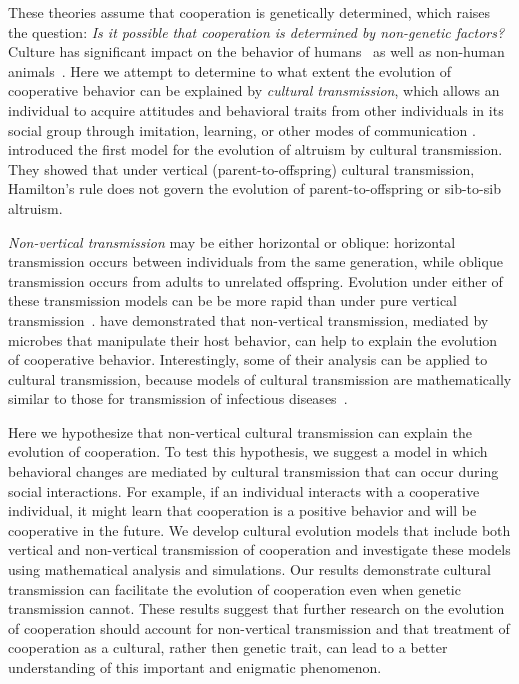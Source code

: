 \documentclass[12pt]{extarticle}
\begin{document}
These theories assume that cooperation is genetically determined, which raises the question: \emph{Is it possible that cooperation is determined by non-genetic factors?}
Culture has significant impact on the behavior of humans~\citep{ihara2004cultural,jeong2018bronze} as well as non-human animals~\citep{bonner2018evolution}.
Here we attempt to determine to what extent the evolution of cooperative behavior can be explained by \emph{cultural transmission},
which allows an individual to acquire attitudes and behavioral traits from other individuals in its social group through imitation, learning, or other modes of communication \citep{cavalli1981cultural,richerson2008not}.
\citet{feldman1985gene} introduced the first model for the evolution of altruism by cultural transmission.
They showed that under vertical (parent-to-offspring) cultural transmission, Hamilton's rule does not govern the evolution of parent-to-offspring or sib-to-sib altruism.

\emph{Non-vertical transmission} may be either horizontal or oblique: horizontal transmission occurs between individuals from the same generation, while oblique transmission occurs from adults to unrelated offspring. 
Evolution under either of these transmission models  can be be more rapid than under pure vertical transmission~\citep{cavalli1981cultural,ram2018evolution}.
\citet{lewin2017microbes} have demonstrated that non-vertical transmission, mediated by microbes that manipulate their host behavior, can help to explain the evolution of cooperative behavior. Interestingly, some of their analysis can be applied to cultural transmission, because models of cultural transmission are mathematically similar to those for transmission of infectious diseases~\citep{cavalli1981cultural}.

Here we hypothesize that non-vertical cultural transmission can explain the evolution of cooperation. 
To test this hypothesis, we suggest a model in which behavioral changes are mediated by cultural transmission that can occur during social interactions. For example, if an individual interacts with a cooperative individual, it might learn that cooperation is a positive behavior and will be cooperative in the future. 
We develop cultural evolution models that include both vertical and non-vertical transmission of cooperation and investigate these models using mathematical analysis and simulations.  
Our results demonstrate cultural transmission can facilitate the evolution of cooperation even when genetic transmission cannot.
These results suggest that further research on the evolution of cooperation should account for non-vertical transmission and that treatment of cooperation as a cultural, rather then genetic trait, can lead to a better understanding of this important and enigmatic phenomenon.
\end{document}
